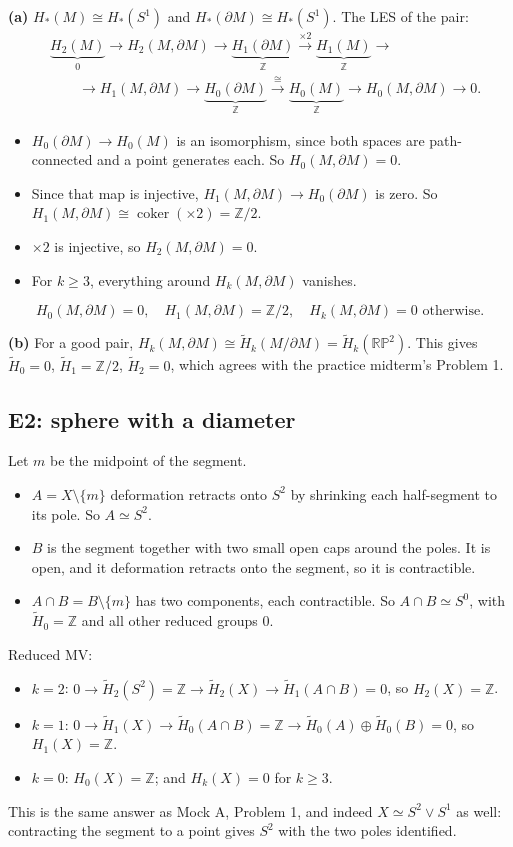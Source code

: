 \documentclass[11pt]{article}
\newcommand{\Z}{\mathbb Z}
\newcommand{\RP}{\mathbb{RP}}
\newcommand{\Hred}{\tilde H}
\newcommand{\coker}{\operatorname{coker}}
\begin{document}
\textbf{(a)} $H_*(M)\cong H_*(S^1)$ and $H_*(\partial M)\cong H_*(S^1)$. The LES of the pair:
\begin{align*}
&\underbrace{H_2(M)}_0\to H_2(M,\partial M)\to\underbrace{H_1(\partial M)}_{\Z}\xrightarrow{\times2}\underbrace{H_1(M)}_{\Z}\to\\
&\qquad\to H_1(M,\partial M)\to\underbrace{H_0(\partial M)}_{\Z}\xrightarrow{\cong}\underbrace{H_0(M)}_{\Z}\to H_0(M,\partial M)\to0.
\end{align*}
\begin{itemize}
\item $H_0(\partial M)\to H_0(M)$ is an isomorphism, since both spaces are path-connected and a point generates each. So $H_0(M,\partial M)=0$.
\item Since that map is injective, $H_1(M,\partial M)\to H_0(\partial M)$ is zero. So $H_1(M,\partial M)\cong\coker(\times2)=\Z/2$.
\item $\times2$ is injective, so $H_2(M,\partial M)=0$.
\item For $k\ge3$, everything around $H_k(M,\partial M)$ vanishes.
\end{itemize}
\[H_0(M,\partial M)=0,\quad H_1(M,\partial M)=\Z/2,\quad H_k(M,\partial M)=0\text{ otherwise.}\]

\textbf{(b)} For a good pair, $H_k(M,\partial M)\cong\Hred_k(M/\partial M)=\Hred_k(\RP^2)$. This gives $\Hred_0=0$, $\Hred_1=\Z/2$, $\Hred_2=0$, which agrees with the practice midterm's Problem 1.

\subsection*{E2: sphere with a diameter}

Let $m$ be the midpoint of the segment.
\begin{itemize}
\item $A=X\setminus\{m\}$ deformation retracts onto $S^2$ by shrinking each half-segment to its pole. So $A\simeq S^2$.
\item $B$ is the segment together with two small open caps around the poles. It is open, and it deformation retracts onto the segment, so it is contractible.
\item $A\cap B=B\setminus\{m\}$ has two components, each contractible. So $A\cap B\simeq S^0$, with $\Hred_0=\Z$ and all other reduced groups $0$.
\end{itemize}
Reduced MV:
\begin{itemize}
\item $k=2$: $0\to\Hred_2(S^2)=\Z\to\Hred_2(X)\to\Hred_1(A\cap B)=0$, so $H_2(X)=\Z$.
\item $k=1$: $0\to\Hred_1(X)\to\Hred_0(A\cap B)=\Z\to\Hred_0(A)\oplus\Hred_0(B)=0$, so $H_1(X)=\Z$.
\item $k=0$: $H_0(X)=\Z$; and $H_k(X)=0$ for $k\ge3$.
\end{itemize}
This is the same answer as Mock A, Problem 1, and indeed $X\simeq S^2\vee S^1$ as well: contracting the segment to a point gives $S^2$ with the two poles identified.
\end{document}
